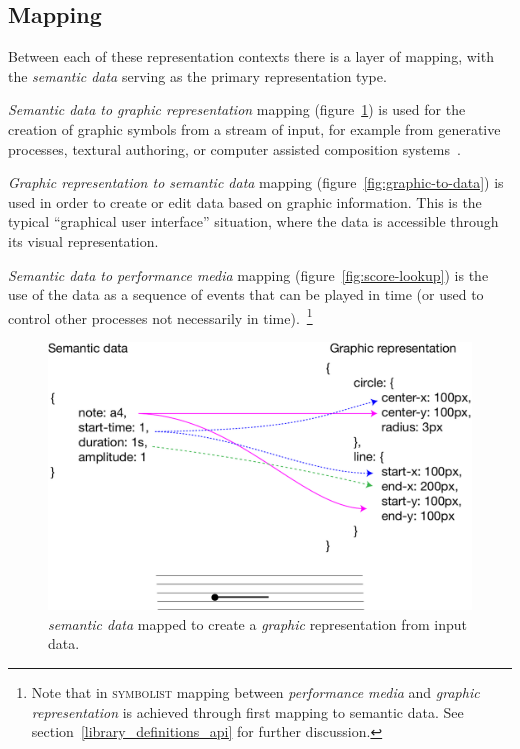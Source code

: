 \documentclass{article}
\def\symbolist{\textsc{symbolist}\xspace}
\begin{document}
\subsection{Mapping}\label{subsec:mapping}

Between each of these representation contexts there is a layer of mapping, with the \textit{semantic data} serving as the primary representation type. 

\textit{Semantic data to graphic representation} mapping (figure~\ref{fig:data-to-graphic}) is used for the creation of graphic symbols from a stream of input, for example from generative processes, textural authoring, or computer assisted composition systems~\cite{bresson2011om, didkovsky2008maxscore, agostini2015max, baca2015abjad, burloiu2017visual}.

\textit{Graphic representation to semantic data} mapping (figure~\ref{fig:graphic-to-data}) is used in order to create or edit data based on graphic information. This is the typical ``graphical user interface'' situation, where the data is accessible through its visual representation.

\textit{Semantic data to performance media} mapping (figure~\ref{fig:score-lookup}) is the use of the data as a sequence of events that can be played in time (or used to control other processes not necessarily in time).~\footnote{Note that in \symbolist mapping between \textit{performance media} and \textit{graphic representation} is achieved through first mapping to semantic data. See section~\ref{library_definitions_api} for further discussion.}


\begin{figure}[ht!]
\centering
\includegraphics[width=0.8\columnwidth]{data-to-graphic.pdf}
\caption{\textit{semantic data} mapped to create a \textit{graphic} representation from input data.
\label{fig:data-to-graphic}}
\end{figure}
\end{document}
